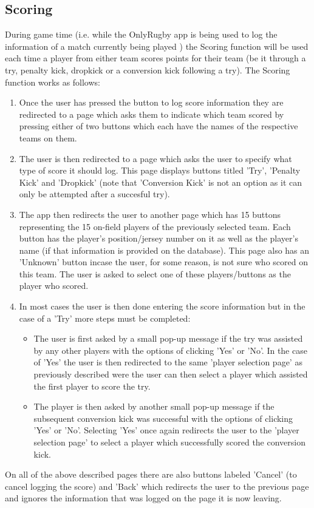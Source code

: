 \documentclass[hidelinks,a4paper,12pt]{article}
\begin{document}
	\subsection{Scoring}
		During game time (i.e. while the OnlyRugby app is being used to log the information of a match currently being played ) the Scoring function will be used each time a player from either team scores points for their team (be it through a try, penalty kick, dropkick or a conversion kick following a try). The Scoring function works as follows:
		\begin{enumerate}
			\item Once the user has pressed the button to log score information they are redirected to a page which asks them to indicate which team scored by pressing either of two buttons which each have the names of the respective teams on them.
			\item The user is then redirected to a page which asks the user to specify what type of score it should log. This page displays buttons titled 'Try', 'Penalty Kick' and  'Dropkick' (note that 'Conversion Kick' is not an option as it can only be attempted after a succesful try). 
			\item The app then redirects the user to another page which has 15 buttons representing the 15 on-field players of the previously selected team. Each button has the player's position/jersey number on it as well as the player's name (if that information is provided on the database). This page also has an 'Unknown' button incase the user, for some reason, is not sure who scored on this team. The user is asked to select one of these players/buttons as the player who scored.
			\item In most cases the user is then done entering the score information but in the case of a 'Try' more steps must be completed:
				\begin{itemize}
					\item The user is first asked by a small pop-up message if the try was assisted by any other players with the options of clicking 'Yes' or 'No'. In the case of 'Yes' the user is then redirected to the same 'player selection page' as previously described were the user can then select a player which assisted the first player to score the try.
					\item The player is then asked by another small pop-up message if the subsequent conversion kick was successful with the options of clicking 'Yes' or 'No'. Selecting 'Yes' once again redirects the user to the 'player selection page' to select a player which successfully scored the conversion kick.
				\end{itemize}
		\end{enumerate}
	On all of the above described pages there are also buttons labeled 'Cancel' (to cancel logging the score) and 'Back' which redirects the user to the previous page and ignores the information that was logged on the page it is now leaving.
\end{document}
